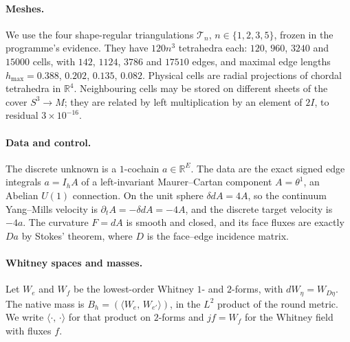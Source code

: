 \documentclass[11pt]{article}
\theoremstyle{definition}
\theoremstyle{remark}
\newcommand{\RR}{\mathbb{R}}
\newcommand{\T}{\mathcal{T}}
\newcommand{\ip}[2]{\langle #1,\,#2\rangle}
\begin{document}
\paragraph{Meshes.}
We use the four shape-regular triangulations $\T_n$, $n\in\{1,2,3,5\}$, frozen in the
programme's evidence. They have $120n^3$ tetrahedra each: $120$, $960$, $3240$ and
$15000$ cells, with $142$, $1124$, $3786$ and $17510$ edges, and maximal edge lengths
$h_{\max} = 0.388$, $0.202$, $0.135$, $0.082$. Physical cells are radial projections of
chordal tetrahedra in $\RR^4$. Neighbouring cells may be stored on different sheets of
the cover $S^3\to M$; they are related by left multiplication by an element of $2I$, to
residual $3\times 10^{-16}$.

\paragraph{Data and control.}
The discrete unknown is a $1$-cochain $a\in\RR^{E}$. The data are the exact signed edge
integrals $a=I_hA$ of a left-invariant Maurer--Cartan component $A=\theta^1$, an Abelian
$U(1)$ connection. On the unit sphere $\delta dA=4A$, so the continuum Yang--Mills
velocity is $\partial_tA=-\delta dA=-4A$, and the discrete target velocity is $-4a$. The
curvature $F=dA$ is smooth and closed, and its face fluxes are exactly $Da$ by Stokes'
theorem, where $D$ is the face--edge incidence matrix.

\paragraph{Whitney spaces and masses.}
Let $W_e$ and $W_f$ be the lowest-order Whitney $1$- and $2$-forms, with
$dW_\eta=W_{D\eta}$. The native mass is $B_h=(\ip{W_e}{W_{e'}})$, in the $L^2$ product
of the round metric. We write $\ip{\cdot}{\cdot}$ for that product on $2$-forms and
$j f=W_f$ for the Whitney field with fluxes $f$.
\end{document}
